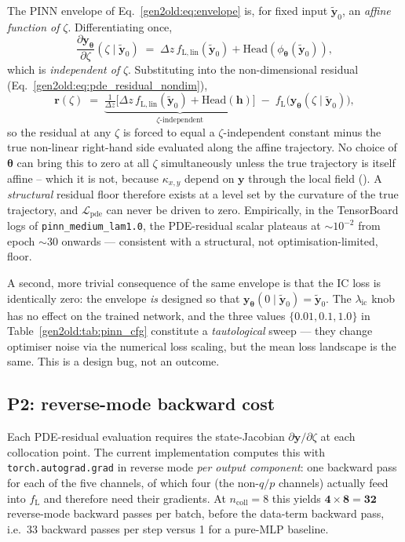 \documentclass[a4paper,11pt]{article}
\newcommand{\qop}{q/p}
\newcommand{\dz}{\Delta z}
\newcommand{\state}{\mathbf{y}}
\newcommand{\loss}{\mathcal{L}}
\newcommand{\btheta}{\bm{\theta}}
\begin{document}
The PINN envelope of Eq.~\ref{gen2old:eq:envelope} is, for fixed input
$\tilde{\state}_0$, an \emph{affine function of} $\zeta$. Differentiating
once,
\begin{equation*}
  \frac{\partial\state_{\btheta}}{\partial\zeta}(\zeta\mid\tilde{\state}_0)
  \;=\;
  \dz\,f_{\mathrm{L,lin}}(\tilde{\state}_0) + \mathrm{Head}(\phi_{\btheta}(\tilde{\state}_0)),
\end{equation*}
which is \emph{independent of} $\zeta$. Substituting into the non-dimensional
residual (Eq.~\ref{gen2old:eq:pde_residual_nondim}),
\begin{equation*}
  \mathbf{r}(\zeta)
  \;=\;
  \underbrace{\tfrac{1}{\dz}\bigl[\dz\,f_{\mathrm{L,lin}}(\tilde{\state}_0) + \mathrm{Head}(\mathbf{h})\bigr]}_{\text{$\zeta$-independent}}
  \;-\;
  f_{\mathrm{L}}\bigl(\state_{\btheta}(\zeta\mid\tilde{\state}_0)\bigr),
\end{equation*}
so the residual at any $\zeta$ is forced to equal a $\zeta$-independent
constant minus the true non-linear right-hand side evaluated along the
affine trajectory. No choice of $\btheta$ can bring this to zero at all
$\zeta$ simultaneously unless the true trajectory is itself affine --
which it is not, because $\kappa_{x,y}$ depend on $\state$ through the
local field (\cite{gen1report}). A \emph{structural} residual floor
therefore exists at a level set by the curvature of the true trajectory,
and $\loss_{\mathrm{pde}}$ can never be driven to zero. Empirically, in the
TensorBoard logs of \texttt{pinn\_medium\_lam1.0}, the PDE-residual scalar
plateaus at $\sim\!10^{-2}$ from epoch $\sim\!30$ onwards --- consistent
with a structural, not optimisation-limited, floor.

A second, more trivial consequence of the same envelope is that the IC
loss is identically zero: the envelope \emph{is} designed so that
$\state_{\btheta}(0\mid\tilde{\state}_0)=\tilde{\state}_0$. The
$\lambda_{\mathrm{ic}}$ knob has no effect on the trained network, and
the three values $\{0.01,0.1,1.0\}$ in
Table~\ref{gen2old:tab:pinn_cfg} constitute a \emph{tautological} sweep
--- they change optimiser noise via the numerical loss scaling, but the
mean loss landscape is the same. This is a design bug, not an outcome.

\subsection{P2: reverse-mode backward cost}\label{gen2old:sub:p2}

Each PDE-residual evaluation requires the state-Jacobian
$\partial\state/\partial\zeta$ at each collocation point. The current
implementation computes this with \texttt{torch.autograd.grad} in
reverse mode \emph{per output component}: one backward pass for each of
the five channels, of which four (the non-$\qop$ channels) actually feed
into $f_{\mathrm{L}}$ and therefore need their gradients. At
$n_{\mathrm{coll}}=8$ this yields $\mathbf{4\!\times\!8 = 32}$
reverse-mode backward passes per batch, before the data-term backward
pass, i.e.\ 33 backward passes per step versus 1 for a pure-MLP baseline.
\end{document}
